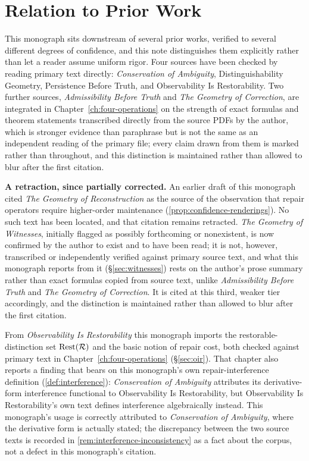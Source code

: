 \chapter*{Relation to Prior Work}

This monograph sits downstream of several prior works, verified to
several different degrees of confidence, and this note distinguishes
them explicitly rather than let a reader assume uniform rigor. Four
sources have been checked by reading primary text directly:
\emph{Conservation of Ambiguity}, Distinguishability Geometry,
Persistence Before Truth, and Observability Is Restorability. Two
further sources, \emph{Admissibility Before Truth} and \emph{The
Geometry of Correction}, are integrated in Chapter~\ref{ch:four-operations}
on the strength of exact formulas and
theorem statements transcribed directly from the source PDFs by the
author, which is stronger evidence than paraphrase but is not the same as
an independent reading of the primary file; every claim drawn from them is marked
\transcribed{} rather than \imported{} throughout, and this distinction
is maintained rather than allowed to blur after the first citation.

\textbf{A retraction, since partially corrected.} An earlier draft of
this monograph cited \emph{The Geometry of Reconstruction} as the source
of the observation that repair operators require higher-order
maintenance (\cref{prop:confidence-renderings}). No such text has been
located, and that citation remains retracted. \emph{The Geometry of
Witnesses}, initially flagged as possibly forthcoming or nonexistent, is
now confirmed by the author to exist and to have been read; it is not,
however, transcribed or independently verified against primary source
text, and what this
monograph reports from it (\S\ref{sec:witnesses}) rests on the author's
prose summary rather than exact formulas copied from source text, unlike
\emph{Admissibility Before Truth} and \emph{The Geometry of Correction}.
It is cited at this third, weaker tier accordingly, and the distinction
is maintained rather than allowed to blur after the first citation.

From \emph{Observability Is Restorability} this monograph imports the
restorable-distinction set $\mathrm{Rest}(\mathcal{R})$ and the basic notion of repair
cost, both checked against primary text in
Chapter~\ref{ch:four-operations} (\S\ref{sec:oir}). That chapter also
reports a finding that bears on this monograph's own repair-interference
definition (\cref{def:interference}): \emph{Conservation of Ambiguity}
attributes its derivative-form interference functional to Observability
Is Restorability, but Observability Is Restorability's own text defines
interference algebraically instead. This monograph's usage is correctly
attributed to \emph{Conservation of Ambiguity}, where the derivative form
is actually stated; the discrepancy between the two source texts is
recorded in \cref{rem:interference-inconsistency} as a fact about the
corpus, not a defect in this monograph's citation.

